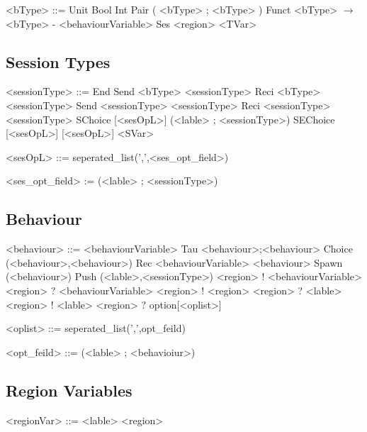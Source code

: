 \documentclass[12pt]{article}
\begin{document}
\begin{grammar}

<bType> ::= Unit
\alt Bool
\alt Int
\alt Pair ( <bType> ; <bType> )
\alt Funct <bType> $\rightarrow$ <bType> - <behaviourVariable>
\alt Ses <region>
\alt <TVar>

\end{grammar}

\subsection{Session Types}

\begin{grammar}

<sessionType> ::= End
\alt Send <bType> <sessionType>
\alt Reci <bType> <sessionType>
\alt Send <sessionType> <sessionType>
\alt Reci <sessionType> <sessionType>
\alt SChoice [<sesOpL>] (<lable> ; <sessionType>)
\alt SEChoice [<sesOpL>] [<sesOpL>]
\alt <SVar>

<sesOpL> ::= seperated_list(',',<ses_opt_field>)

<ses_opt_field> := (<lable> ; <sessionType>)

\end{grammar}

\subsection{Behaviour}

\begin{grammar}

<behaviour> ::= <behaviourVariable>
\alt Tau
\alt <behaviour>;<behaviour>
\alt Choice (<behaviour>,<behaviour>)
\alt Rec <behaviourVariable> <behaviour>
\alt Spawn (<behaviour>)
\alt Push (<lable>,<sessionType>)
\alt <region> ! <behaviourVariable>
\alt <region> ? <behaviourVariable>
\alt <region> ! <region>
\alt <region> ? <lable>
\alt <region> ! <lable>
\alt <region> ? option[<oplist>]

<oplist> ::= seperated_list(',',opt_feild)

<opt_feild> ::= (<lable> ; <behavioiur>)

\end{grammar}

\subsection {Region Variables}

\begin{grammar}

<regionVar> ::= <lable>
\alt <region>

\end{grammar}
\end{document}
